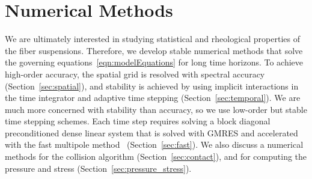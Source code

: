 \documentclass[AMA,STIX1COL]{WileyNJD-v2}
\begin{document}
%
		
\section{Numerical Methods}\label{s:method}
We are ultimately interested in studying statistical and rheological
properties of the fiber suspensions.  Therefore, we develop stable
numerical methods that solve the governing
equations~\eqref{eqn:modelEquations} for long time horizons.  To achieve
high-order accuracy, the spatial grid is resolved with spectral accuracy
(Section~\ref{sec:spatial}), and stability is achieved by using implicit
interactions in the time integrator and adaptive time stepping
(Section~\ref{sec:temporal}).  We are much more concerned with stability
than accuracy, so we use low-order but stable time stepping schemes.
Each time step requires solving a block diagonal preconditioned dense
linear system that is solved with GMRES and accelerated with the fast
multipole method~\cite{Greenbaum1992} (Section~\ref{sec:fast}).  We also
discuss a numerical methods for the collision algorithm
(Section~\ref{sec:contact}), and for computing the pressure and stress
(Section~\ref{sec:pressure_stress}).
\end{document}
